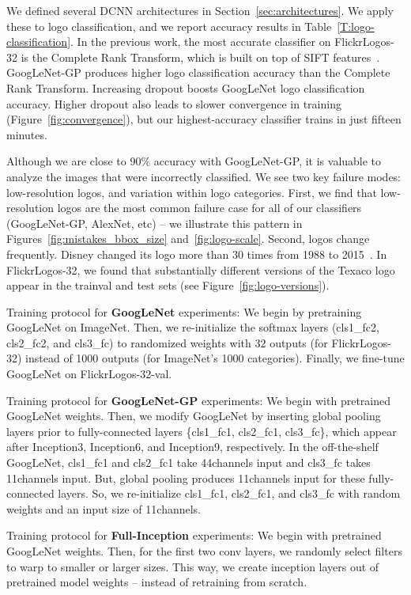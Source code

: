\documentclass{bmvc2k}
\begin{document}
We defined several DCNN architectures in Section~\ref{sec:architectures}.
We apply these to logo classification, and we report accuracy results in Table~\ref{T:logo-classification}.
In the previous work, the most accurate classifier on FlickrLogos-32 is the Complete Rank Transform, which is built on top of SIFT features~\cite{Boia2014}.
GoogLeNet-GP produces higher logo classification accuracy than the Complete Rank Transform.
Increasing dropout boosts GoogLeNet logo classification accuracy.
Higher dropout also leads to slower convergence in training (Figure~\ref{fig:convergence}), but our highest-accuracy classifier trains in just fifteen minutes.

Although we are close to 90\% accuracy with GoogLeNet-GP, it is valuable to analyze the images that were incorrectly classified.
We see two key failure modes: low-resolution logos, and variation within logo categories.
First, we find that low-resolution logos are the most common failure case for all of our classifiers (GoogLeNet-GP, AlexNet, etc) -- we illustrate this pattern in Figures~\ref{fig:mistakes_bbox_size} and~\ref{fig:logo-scale}.
Second, logos change frequently.
Disney changed its logo more than 30 times from 1988 to 2015~\cite{DisneyLogo}.
In FlickrLogos-32, we found that substantially different versions of the Texaco logo appear in the trainval and test sets (see Figure~\ref{fig:logo-versions}).


Training protocol for {\bf GoogLeNet} experiments:
We begin by pretraining GoogLeNet on ImageNet.
Then, we re-initialize the softmax layers (cls1\_fc2, cls2\_fc2, and cls3\_fc) to randomized weights with 32 outputs (for FlickrLogos-32) instead of 1000 outputs (for ImageNet's 1000 categories).
Finally, we fine-tune GoogLeNet on FlickrLogos-32-val.

Training protocol for {\bf GoogLeNet-GP} experiments:
We begin with pretrained GoogLeNet weights.
Then, we modify GoogLeNet by inserting global pooling layers prior to fully-connected layers \{cls1\_fc1, cls2\_fc1, cls3\_fc\}, which appear after Inception3, Inception6, and Inception9, respectively.
In the off-the-shelf GoogLeNet, cls1\_fc1 and cls2\_fc1 take 44channels input and cls3\_fc takes 11channels input.
But, global pooling produces 11channels input for these fully-connected layers.
So, we re-initialize cls1\_fc1, cls2\_fc1, and cls3\_fc with random weights and an input size of 11channels.

Training protocol for {\bf Full-Inception} experiments:
We begin with pretrained GoogLeNet weights.
Then, for the first two conv layers, we randomly select filters to warp to smaller or larger sizes.
This way, we create inception layers out of pretrained model weights -- instead of retraining from scratch.
\end{document}
